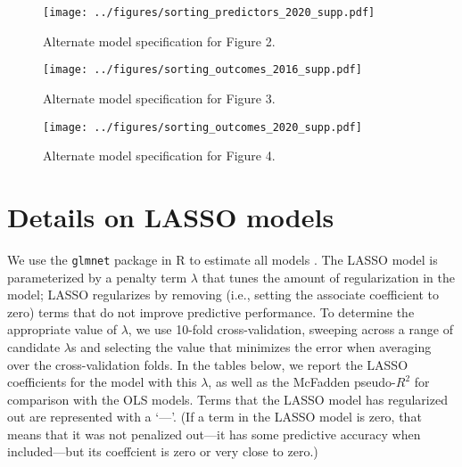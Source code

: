 \documentclass[10pt,landscape]{article}
\begin{document}
\begin{figure}[h]
    \centering
    \texttt{[image: ../figures/sorting\_predictors\_2020\_supp.pdf]}
    \caption{Alternate model specification for Figure 2.}
    \label{fig:sorting_predictors_2020_supp}
\end{figure}

\begin{figure}[h]
    \centering
    \texttt{[image: ../figures/sorting\_outcomes\_2016\_supp.pdf]}
    \caption{Alternate model specification for Figure 3.}
    \label{fig:sorting_outcomes_2016_supp}
\end{figure}

\begin{figure}[h]
    \centering
    \texttt{[image: ../figures/sorting\_outcomes\_2020\_supp.pdf]}
    \caption{Alternate model specification for Figure 4.}
    \label{fig:sorting_outcomes_2020_supp}
\end{figure}

\clearpage

\clearpage


\clearpage


\clearpage

\clearpage

\clearpage

\clearpage


\clearpage

\clearpage

\clearpage

\clearpage

\section{Details on LASSO models}

We use the \texttt{glmnet} package in R to estimate all models \parencite{simon_regularization_2011}. 
The LASSO model is parameterized by a penalty term \(\lambda\) that tunes the amount of regularization in the model; LASSO regularizes by removing (i.e., setting the associate coefficient to zero) terms that do not improve predictive performance.
To determine the appropriate value of \(\lambda\), we use 10-fold cross-validation, sweeping across a range of candidate \(\lambda\)s and selecting the value that minimizes the error when averaging over the cross-validation folds.
In the tables below, we report the LASSO coefficients for the model with this \(\lambda\), as well as the McFadden pseudo-\(R^2\) for comparison with the OLS models.
Terms that the LASSO model has regularized out are represented with a `---'. 
(If a term in the LASSO model is zero, that means that it was not penalized out---it has some predictive accuracy when included---but its coeffcient is zero or very close to zero.)
\end{document}
